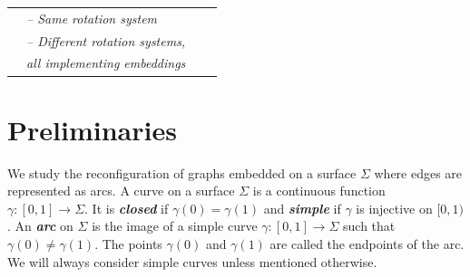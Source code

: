 \documentclass[a4paper,USenglish,cleveref,colorlinks=true,urlcolor=black,linkcolor=black,citecolor=black,thm-restate,authorcolumns]{lipics-v2021}
\theoremstyle{claimstyle}
\def\defn#1{\textit{\textbf{\boldmath #1}}}
\renewcommand{\emph}[1]{\defn{#1}}
\begin{document}
\begin{table}[t]
\begin{tabular}{llcc}
                                                  & \cellcolor{lipicsBulletGray!35}\textit{-- Same rotation system}                  &    \cellcolor{lipicsBulletGray!35}             & \cellcolor{lipicsBulletGray!35}                                                            \\
                                  \cellcolor{lipicsBulletGray!35}                & \cellcolor{lipicsBulletGray!35}\textit{-- Different rotation systems,}           &            \multicolumn{2}{c}{\cellcolor{lipicsBulletGray!35}{\cref{thm:negative}}}                                                                                                                          \\\cellcolor{lipicsBulletGray!35}
                                 \cellcolor{lipicsBulletGray!35}                 &\cellcolor{lipicsBulletGray!35}\textit{\phantom{--} all implementing embeddings}           &\cellcolor{lipicsBulletGray!35}                                         &\cellcolor{lipicsBulletGray!35}                                                                                  \\
        \end{tabular}
\end{table}


\section{Preliminaries}
\label{sec:pre}

We study the reconfiguration of graphs embedded on a surface $\Sigma$ where edges are represented as arcs.
%
A curve on a surface $\Sigma$ is a continuous function $\gamma:[0,1]\to\Sigma$.
It is \emph{closed} if $\gamma(0)=\gamma(1)$ and \emph{simple} if $\gamma$ is injective on $[0,1)$.
An \emph{arc} on $\Sigma$ is the image of a simple curve $\gamma:[0,1]\to\Sigma$ such that $\gamma(0)\neq\gamma(1)$.
The points $\gamma(0)$ and $\gamma(1)$ are called the endpoints of the arc.
We will always consider simple curves unless mentioned otherwise.
\end{document}
